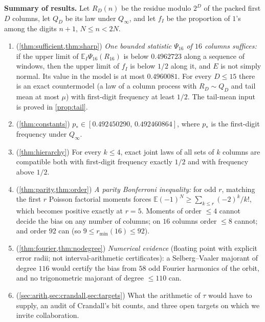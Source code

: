 \documentclass[11pt]{article}
\newcommand{\Ex}{\mathbb E}
\newcommand{\Av}{\mathbb E}
\newcommand{\Qinf}{{Q_\infty}}
\begin{document}
\medskip\noindent\textbf{Summary of results.} Let $R_D(n)$ be the residue modulo $2^D$ of the packed first $D$ columns, let $Q_D$ be its law under $\Qinf$, and let $f_I$ be the proportion of $1$'s among the digits $n+1$, $N\le n<2N$.

\begin{enumerate}[label=(\roman*),leftmargin=2em]
\item (\cref{thm:sufficient,thm:sharp}) \emph{One bounded statistic $\Psi_{16}$ of $16$ columns suffices:} if the upper limit of $\Av_I\Psi_{16}(R_{16})$ is below $0.4962723$ along a sequence of windows, then the upper limit of $f_I$ is below $1/2$ along it, and $E$ is not simply normal. Its value in the model is at most $0.4960081$. For every $D\le15$ there is an exact countermodel (a law of a column process with $R_D\sim Q_D$ and tail mean at most $\mu$) with first-digit frequency at least $1/2$. The tail-mean input is proved in \cref{prop:tail}.
\item (\cref{thm:constants}) $p_*\in[0.492450290,\,0.492460864]$, where $p_*$ is the first-digit frequency under $\Qinf$.
\item (\cref{thm:hierarchy}) For every $k\le4$, exact joint laws of all sets of $k$ columns are compatible both with first-digit frequency exactly $1/2$ and with frequency above $1/2$.
\item (\cref{thm:parity,thm:order}) \emph{A parity Bonferroni inequality:} for odd $r$, matching the first $r$ Poisson factorial moments forces $\Ex(-1)^N\ge\sum_{k\le r}(-2)^k/k!$, which becomes positive exactly at $r=5$. Moments of order $\le4$ cannot decide the bias on any number of columns; on $16$ columns order $\le8$ cannot; and order $92$ can (so $9\le r_{\min}(16)\le 92$).
\item (\cref{thm:fourier,thm:nodegree}) \emph{Numerical evidence} (floating point with explicit error radii; not interval-arithmetic certificates): a Selberg--Vaaler majorant of degree $116$ would certify the bias from $58$ odd Fourier harmonics of the orbit, and no trigonometric majorant of degree $\le110$ can.
\item (\cref{sec:arith,sec:crandall,sec:targets}) What the arithmetic of $\tau$ would have to supply, an audit of Crandall's bit counts, and three open targets on which we invite collaboration.
\end{enumerate}
\end{document}
